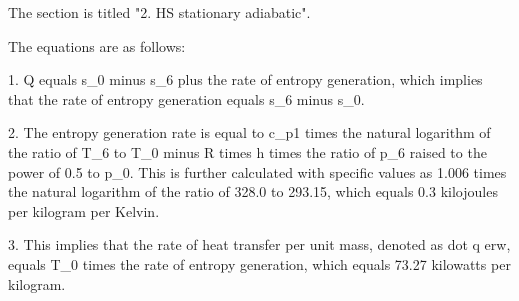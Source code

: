 The section is titled "2. HS stationary adiabatic".

The equations are as follows:

1. Q equals s_0 minus s_6 plus the rate of entropy generation, which implies that the rate of entropy generation equals s_6 minus s_0.

2. The entropy generation rate is equal to c_p1 times the natural logarithm of the ratio of T_6 to T_0 minus R times h times the ratio of p_6 raised to the power of 0.5 to p_0. This is further calculated with specific values as 1.006 times the natural logarithm of the ratio of 328.0 to 293.15, which equals 0.3 kilojoules per kilogram per Kelvin.

3. This implies that the rate of heat transfer per unit mass, denoted as dot q erw, equals T_0 times the rate of entropy generation, which equals 73.27 kilowatts per kilogram.
